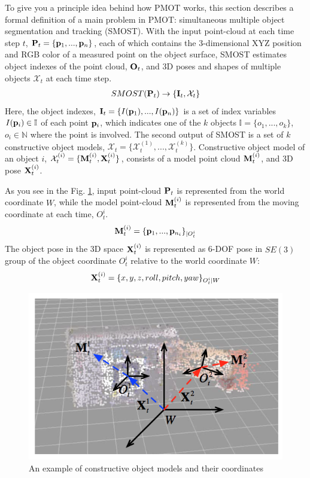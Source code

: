 \documentclass[a4paper,twoside, openright,12pt]{report}
\begin{document}
To give you a principle idea behind how PMOT works, this section describes a formal definition of a main problem in PMOT: simultaneous multiple object segmentation and tracking (SMOST).
With the input point-cloud at each time step $t$, ${\bf{P}}_t = \{{\bf{p}}_{1}, ..., {\bf{p}}_{n}\}$, each of which contains the 3-dimensional XYZ position and RGB color of a measured point on the object surface, SMOST estimates object indexes of the point cloud, ${\bf{O}}_t$, and 3D poses and shapes of multiple objects ${\mathcal{X}}_t$ at each time step.
\begin{eqnarray}
SMOST({\bf{P}}_t) \rightarrow \{{\bf{I}}_t, {\mathcal{X}}_t\}	\label{eq:dss_measurement_sko}
\end{eqnarray}
Here, the object indexes, ${\bf{I}}_t = \{I({\bf{p}}_{1}), ..., I({\bf{p}}_{n})\}$ is a set of index variables $I({\bf{p}}_i) \in {\mathbb{I}}$ of each point ${\bf{p}}_i$, which indicates one of the $k$ objects $\mathbb{I}=\{o_1,...,o_k\}$, $o_i \in \mathbb{N}$ where the point is involved.
The second output of SMOST is a set of $k$ constructive object models, ${\mathcal{X}}_t = \{ {\mathcal{X}}_t^{(1)}, ...,  {\mathcal{X}}_t^{(k)} \}$.
Constructive object model of an object $i$, ${\mathcal{X}}_t^{(i)}=\{ {\bf{M}}_t^{(i)}, {\bf{X}}_t^{(i)} \}$, consists of a model point cloud ${\bf{M}}_t^{(i)}$, and 3D pose ${\bf{X}}_t^{(i)}$.

As you see in the Fig. \ref{fig:objectmodel}, input point-cloud ${\bf{P}}_t$ is represented from the world coordinate $W$, while the model point-cloud ${\bf{M}}_t^{(i)}$ is represented from the moving coordinate at each time, $O_t^i$.
\begin{equation}
{\bf{M}}_t^{(i)}= \{{\bf{p}}_{1}, ..., {\bf{p}}_{n_i}\}_{\arrowvert O_t^i}
\end{equation} 
The object pose in the 3D space ${\bf{X}}_t^{(i)}$ is represented as 6-DOF pose in $SE(3)$ group of the object coordinate $O_t^i$ relative to the world coordinate $W$:
\begin{equation}
{\bf{X}}_t^{(i)}= \{x,y,z,roll,pitch,yaw\}_{O_t^i \arrowvert W}
\end{equation} 

\begin{figure}[t]
	\centering
	\includegraphics[width=0.5\linewidth]{fig/objectmodel.png}
	\caption{An example of constructive object models and their coordinates}
	\label{fig:objectmodel}
\end{figure}
\end{document}

